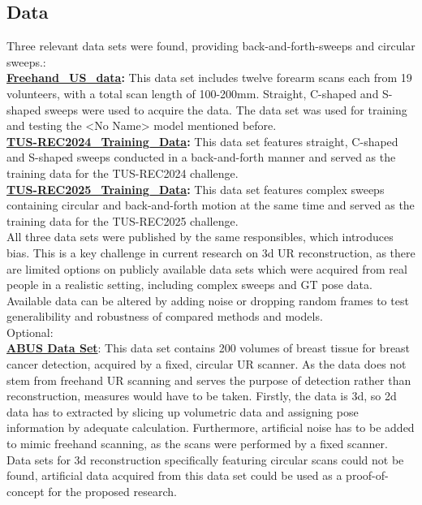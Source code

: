 \documentclass[10.5pt,a4paper]{article}
\begin{document}
\subsection{Data}
Three relevant data sets were found, providing back-and-forth-sweeps and circular sweeps.:\\
\textbf{\href{https://zenodo.org/records/7740734}{Freehand\_US\_data}:} This data set includes twelve forearm scans each from 19 volunteers, with a total scan length of 100-200mm. Straight, C-shaped and S-shaped sweeps were used to acquire the data. The data set was used for training and testing the <No Name> model mentioned before.\\
\textbf{\href{https://zenodo.org/records/11178509}{TUS-REC2024\_Training\_Data}:} This data set features straight, C-shaped and S-shaped sweeps conducted in a back-and-forth manner and served as the training data for the TUS-REC2024 challenge.\\
\textbf{\href{https://zenodo.org/records/15224704}{TUS-REC2025\_Training\_Data}:} This data set features complex sweeps containing circular and back-and-forth motion at the same time and served as the training data for the TUS-REC2025 challenge.\\
All three data sets were published by the same responsibles, which introduces bias. This is a key challenge in current research on 3d UR reconstruction, as there are limited options on publicly available data sets which were acquired from real people in a realistic setting, including complex sweeps and GT pose data\cite{Li.2025}. Available data can be altered by adding noise or dropping random frames to test generalibility and robustness of compared methods and models.\\
Optional:\\
\textbf{\href{https://tdsc-abus2023.grand-challenge.org/Dataset/}{ABUS Data Set}}: This data set contains 200 volumes of breast tissue for breast cancer detection, acquired by a fixed, circular UR scanner. As the data does not stem from freehand UR scanning and serves the purpose of detection rather than reconstruction, measures would have to be taken. Firstly, the data is 3d, so 2d data has to extracted by slicing up volumetric data and assigning pose information by adequate calculation. Furthermore, artificial noise has to be added to mimic freehand scanning, as the scans were performed by a fixed scanner. Data sets for 3d reconstruction specifically featuring circular scans could not be found, artificial data acquired from this data set could be used as a proof-of-concept for the proposed research.\\
\end{document}
